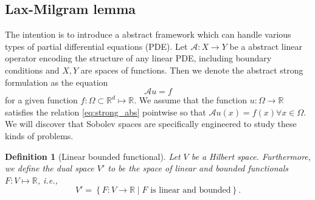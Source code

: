 \documentclass[11pt]{article}
\newtheorem{definition}[theorem]{Definition}
\theoremstyle{remark}
\newcommand{\abs}[1]{\left\lvert #1 \right\rvert}
\numberwithin{equation}{section}
\begin{document}




\subsection{Lax-Milgram lemma}%
\label{sub:lax_milgram_lemma}

The intention is to introduce a abstract framework which can handle various types of partial differential equations (PDE). Let  $\mathcal{A} : X \to Y $ be a abstract linear operator encoding the structure of any linear PDE, including boundary
conditions and $X,Y$ are spaces of functions. Then we denote the abstract strong formulation as the equation
\begin{equation}
\label{eq:strong_abs}
\mathcal{A} u = f
\end{equation}
for a given function $f: \Omega \subset \mathbb{R}^d \mapsto \mathbb{R}$. We assume that the function $u: \Omega \rightarrow \mathbb{R}$ satisfies the relation \eqref{eq:strong_abs} pointwise so that $\mathcal{A} u(x)=f(x) \forall x \in \Omega$.
We will discover that Sobolev spaces are specifically engineered to study these kinds of problems.

\begin{definition}[Linear bounded functional]
    \label{def:linear_function}
Let $V$ be a Hilbert space. Furthermore, we define the dual space $V' $ to be the space of linear and bounded functionals $F: V  \mapsto \mathbb{R} $, i.e.,
\begin{equation}
V'  = \left\{ F: V \to \mathbb{R}   \mid  F \text{ is linear and bounded} \right\}.
\end{equation}
\end{definition}
\end{document}
